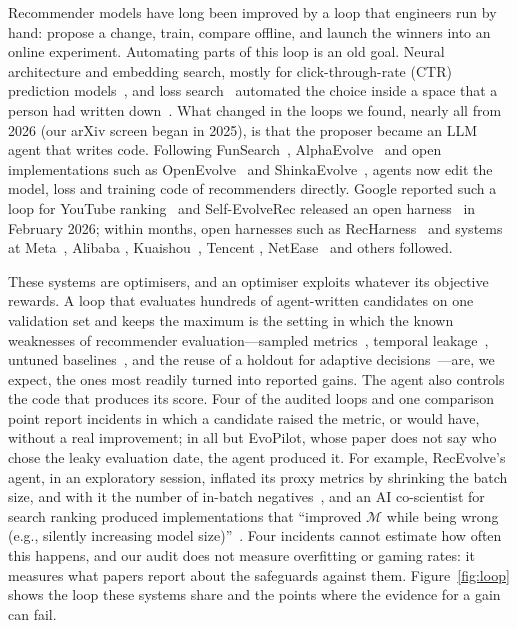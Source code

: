 \documentclass[sigconf,nonacm]{acmart}
\begin{document}
Recommender models have long been improved by a loop that engineers run by hand: propose a change, train, compare
offline, and launch the winners into an online experiment. Automating parts of this loop is an old goal. Neural
architecture and embedding search, mostly for click-through-rate (CTR) prediction
models~\cite{song2020autoctr,liu2020autofis,zhao2020autoemb,zhang2023nasrec}, and loss search~\cite{li2022autolossgen}
automated the choice inside a space that a person had written down~\cite{zheng2022automl}. What changed in the loops we found, nearly all from 2026 (our arXiv screen began in 2025), is that the proposer became an LLM agent that
writes code. Following FunSearch~\cite{romeraparedes2023funsearch}, AlphaEvolve~\cite{novikov2025alphaevolve} and
open implementations such as OpenEvolve~\cite{openevolve} and ShinkaEvolve~\cite{lange2025shinka}, agents now edit
the model, loss and training code of recommenders directly. Google reported such a loop for YouTube
ranking~\cite{wang2026selfevolving} and Self-EvolveRec released an open harness~\cite{kim2026selfevolverec} in February
2026; within months, open harnesses such as RecHarness~\cite{ling2026recharness} and systems at Meta~\cite{meta2026rea,li2026autorecsys}, Alibaba
\cite{mu2026evorec,hu2026astar}, Kuaishou~\cite{lao2026agentx,yang2026sragent,zhuang2026trajectories}, Tencent
\cite{liu2026nova,ao2026recsysfactory}, NetEase~\cite{zhang2026autolr} and others followed.

These systems are optimisers, and an optimiser exploits whatever its objective rewards. A loop that evaluates
hundreds of agent-written candidates on one validation set and keeps the maximum is the setting in which the known
weaknesses of recommender evaluation---sampled metrics~\cite{krichene2020sampled}, temporal
leakage~\cite{ji2020leakage}, untuned baselines~\cite{dacrema2019progress,rendle2020ncf}, and the reuse of a holdout
for adaptive decisions~\cite{dwork2015reusable,blum2015ladder}---are, we expect, the ones most readily turned into reported gains. The agent
also controls the code that produces its score. Four of the audited loops and one comparison point report incidents in
which a candidate raised the metric, or would have, without a real improvement; in all but EvoPilot, whose paper does
not say who chose the leaky evaluation date, the agent produced it. For example, RecEvolve's agent, in an exploratory session, inflated its proxy metrics by shrinking the batch size, and with
it the number of in-batch negatives~\cite{pan2026recevolve}, and an AI co-scientist for search ranking produced
implementations that ``improved $\mathcal{M}$ while being wrong (e.g., silently increasing model
size)''~\cite{wu2026coscientist}. Four incidents cannot estimate how often this happens, and our audit does not measure overfitting or gaming rates:
it measures what papers report about the safeguards against them. Figure~\ref{fig:loop} shows the loop these systems share and the points where the
evidence for a gain can fail.
\end{document}
